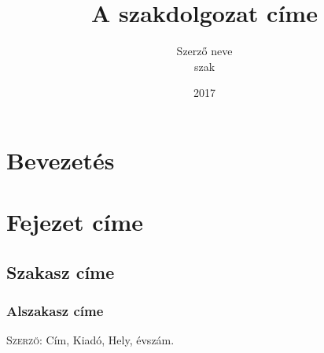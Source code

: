 \documentclass[colorlinks]{thesis-ekf}
\theoremstyle{definition}
\theoremstyle{remark}
\begin{document}
\title{A szakdolgozat címe}
\author{Szerző neve\\ szak}
\date{2017}
\maketitle
\tableofcontents

\chapter*{Bevezetés}
\chapter{Fejezet címe}
\section{Szakasz címe}
\subsection{Alszakasz címe}

\begin{thebibliography}{1}
 \textsc{Szerző}: Cím, Kiadó, Hely, évszám.
\end{thebibliography}
\end{document}
